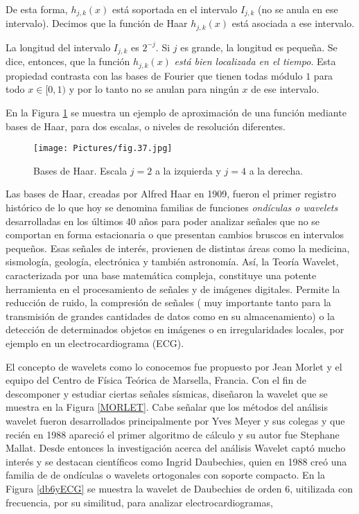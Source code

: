  \bigskip
 
 
 De esta forma,  $h_{j,k}(x)$ está soportada en el intervalo $I_{j,k}$ (no se anula en ese intervalo). Decimos que la función de Haar $h_{j,k}(x)$ está asociada a ese intervalo.
 
 La longitud del intervalo $I_{j,k}$  es $2^{-j}$. Si $j$ es grande, la longitud es pequeña. Se dice, entonces, que  la función $h_{j,k}(x)$   \textit{está bien localizada en el tiempo}. Esta propiedad contrasta con las bases de Fourier que tienen todas módulo $1$  para todo   $x \in [0,1)$ y por lo tanto no se anulan para ningún $x$ de ese intervalo.
 
En la Figura \ref{Haar} se muestra un ejemplo de aproximación de una función mediante bases de Haar, para dos escalas, o niveles de resolución diferentes.

 \bigskip
 
\begin{figure}
    \centering
    \texttt{[image: Pictures/fig.37.jpg]}
    \caption{Bases de Haar. Escala $j=2$ a la  izquierda y $j=4$ a la derecha.}
    \label{Haar}
\end{figure} 

\bigskip
Las bases de  Haar, creadas por Alfred Haar en 1909, fueron el primer registro histórico de lo que hoy se denomina    familias de funciones  \textit{ondículas o wavelets}  desarrolladas en los últimos 40 años  para poder analizar señales que no se comportan en forma estacionaria o que presentan cambios bruscos en intervalos pequeños. Esas señales de interés, provienen de distintas áreas como la medicina, sismología, geología, electrónica y también astronomía.
Así, la Teoría Wavelet, caracterizada por una base matemática compleja, constituye una potente herramienta en el procesamiento de señales y de imágenes digitales. Permite la reducción de ruido, la compresión de señales ( muy importante tanto para la transmisión de grandes cantidades de datos como en su almacenamiento) o la detección de determinados objetos en imágenes o en irregularidades locales, por ejemplo en un electrocardiograma (ECG).



El concepto de wavelets como lo conocemos fue propuesto por Jean Morlet y el equipo del Centro de
Física Teórica de Marsella, Francia. Con el fin de descomponer y estudiar ciertas señales sísmicas, diseñaron la wavelet que se muestra en   la Figura \ref{MORLET}.
Cabe señalar que los métodos del análisis wavelet fueron
desarrollados principalmente por Yves Meyer y sus colegas y que recién en 1988
apareció el primer algoritmo de cálculo y su autor fue Stephane Mallat.
Desde entonces
la investigación acerca del análisis Wavelet  captó mucho interés  y se
destacan científicos como Ingrid Daubechies, quien en 1988 creó una familia de  de ondículas o wavelets  ortogonales con soporte compacto. En la Figura  \ref{db6yECG} se muestra la wavelet de Daubechies de orden 6, uitilizada con frecuencia, por su similitud, para analizar electrocardiogramas, 


